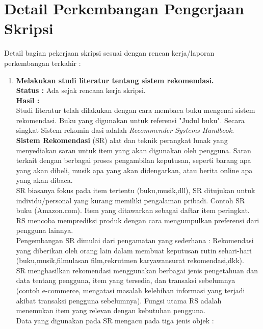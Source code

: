 \documentclass[a4paper,twoside]{article}
\begin{document}
\section{Detail Perkembangan Pengerjaan Skripsi}
Detail bagian pekerjaan skripsi sesuai dengan rencan kerja/laporan perkembangan terkahir :
	\begin{enumerate}
		\item \textbf{
		Melakukan studi literatur tentang sistem rekomendasi.}\\
		{\bf Status :} Ada sejak rencana kerja skripsi.\\
		{\bf Hasil :} \\
		Studi literatur telah dilakukan dengan cara membaca buku mengenai sistem rekomendasi. Buku yang digunakan untuk referensi "Judul buku". Secara singkat Sistem rekomin dasi adalah \textit{Recommender Systems Handbook}.\\
		\textbf{Sistem Rekomendasi} (SR) alat dan teknik perangkat lunak yang menyediakan saran untuk item yang akan digunakan oleh pengguna. Saran terkait dengan berbagai proses pengambilan keputusan, seperti barang apa yang akan dibeli, musik apa yang akan didengarkan, atau berita online apa yang akan dibaca.\\
		SR biasanya fokus pada item tertentu (buku,musik,dll), SR ditujukan untuk individu/personal yang kurang memiliki pengalaman pribadi. Contoh SR buku (Amazon.com). Item yang ditawarkan sebagai daftar item peringkat. RS mencoba memprediksi produk dengan cara mengumpulkan preferensi dari pengguna lainnya.\\
		Pengembangan SR dimulai dari pengamatan yang sederhana : Rekomendasi yang diberikan oleh orang lain dalam membuat keputusan rutin sehari-hari (buku,musik,film{ulasan film},rekrutmen karyawan{surat rekomendasi},dkk).\\
		SR menghasilkan rekomendasi menggunakan berbagai jenis pengetahuan dan data tentang pengguna, item yang tersedia, dan transaksi sebelumnya (contoh e-commerce, mengatasi masalah kelebihan informasi yang terjadi akibat transaksi pengguna sebelumnya). Fungsi utama RS adalah menemukan item yang relevan dengan kebutuhan pengguna.\\
		
		Data yang digunakan pada SR mengacu pada tiga jenis objek :
		

\end{enumerate}
\end{document}
